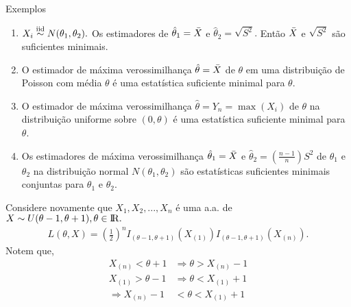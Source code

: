 \documentclass[12pt]{beamer}
\begin{document}
\begin{frame}{Exemplos}
\begin{block}{}
\begin{enumerate}
\justifying
    \item $X_{i}\overset{\text{iid}}{\sim} N(\theta_{1},\theta_{2}).$ Os estimadores de $\hat{\theta}_{1}=\Bar{X}$ e $\hat{\theta}_{2}=\sqrt{S^{2}}.$ Então $\Bar{X}$ e $\sqrt{S^{2}}$ são suficientes minimais.
    
    \item O estimador de máxima verossimilhança $\hat{\theta} = \Bar{X}$ de $\theta$ em uma distribuição de Poisson com média $\theta$ é uma estatística suficiente minimal para $\theta$.

    \item O estimador de máxima verossimilhança $\hat{\theta} = Y_n = \max(X_i)$ de $\theta$ na distribuição uniforme sobre $(0, \theta)$ é uma estatística suficiente minimal para $\theta$.

    \item Os estimadores de máxima verossimilhança $\hat{\theta}_1 = \Bar{X}$ e $\hat{\theta}_2 = \left(\frac{n-1}{n}\right)S^2$ de $\theta_1$ e $\theta_2$ na distribuição normal $N(\theta_1, \theta_2)$ são estatísticas suficientes minimais conjuntas para $\theta_1$ e $\theta_2$.
\end{enumerate}
\end{block}
\end{frame}

\begin{frame}{}
\begin{block}{}
\justifying
Considere novamente que $X_1, X_2, ..., X_n$ é uma a.a. de $X\sim U(\theta - 1, \theta + 1), \theta\in\rm I\!R.$
\begin{align*}
    L(\theta,X)=\left(\frac{1}{2}\right)^n I_{(\theta - 1, \theta + 1)}\left(X_{(1)}\right) I_{(\theta - 1, \theta + 1)}\left(X_{(n)}\right).
\end{align*}
Notem que,
\begin{align*}
X_{(n)}<\theta+1&\Rightarrow \theta>X_{(n)}-1\\
X_{(1)}>\theta-1&\Rightarrow \theta<X_{(1)}+1\\
\Rightarrow X_{(n)}-1&<\theta<X_{(1)}+1
\end{align*}
\end{block}
\end{frame}
\end{document}
